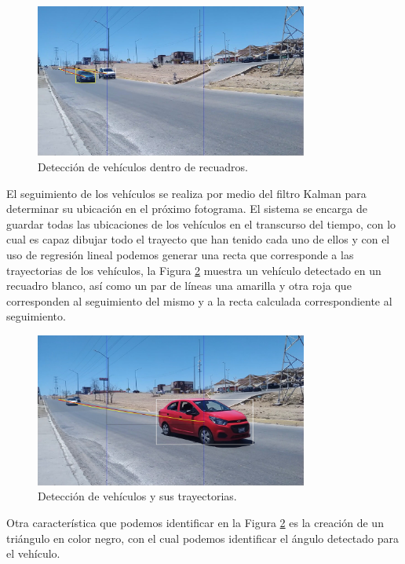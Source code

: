 \begin{figure}[H]
    \centering
    \includegraphics[width=0.8\textwidth]{Metodologia/imgs/Deteccion.jpg}
    \caption{Detección de vehículos dentro de recuadros.}
    \label{fig:LugarDeteccion}
\end{figure}

El seguimiento de los vehículos se realiza por medio del filtro Kalman para determinar su ubicación en el próximo fotograma. El sistema se encarga de guardar todas las ubicaciones de los vehículos en el transcurso del tiempo, con lo cual es capaz dibujar todo el trayecto que han tenido cada uno de ellos y con el uso de regresión lineal podemos generar una recta que corresponde a las trayectorias de los vehículos, la Figura \ref{fig:LugarSeguimiento} muestra un vehículo detectado en un recuadro blanco, así como un par de líneas una amarilla y otra roja que corresponden al seguimiento del mismo y a la recta calculada correspondiente al seguimiento.

\begin{figure}[H]
    \centering
    \includegraphics[width=0.8\textwidth]{Metodologia/imgs/Seguimiento.jpg}
    \caption{Detección de vehículos y sus trayectorias.}
    \label{fig:LugarSeguimiento}
\end{figure}

Otra característica que podemos identificar en la Figura \ref{fig:LugarSeguimiento} es la creación de un triángulo en color negro, con el cual podemos identificar el ángulo detectado para el vehículo.

